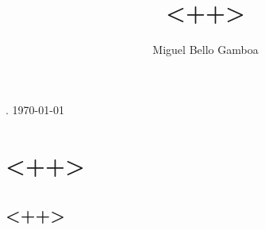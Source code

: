 \documentclass[a4paper, 11pt]{article}
\renewcommand*{\maketitle}{
  {\begin{center}\LARGE\bf\sffamily \thetitle \end{center}}
  {\begin{center}\large \theauthor. \today \end{center}\bigskip}
}
\begin{document}
\title{<++>}
\author{Miguel Bello Gamboa}
\maketitle

\section{<++>}
\subsection{<++>}


 
 
\end{document}
